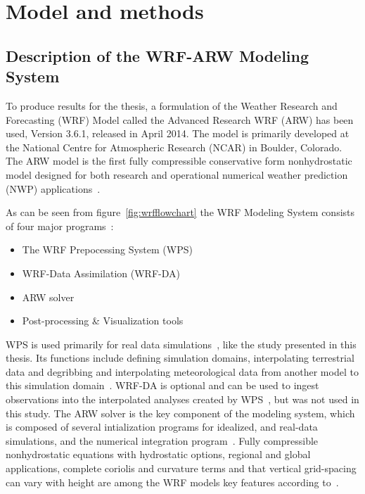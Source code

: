 \chapter{Model and methods}
\label{chap:modmet}
\section{Description of the WRF-ARW Modeling System}
\label{sec:modeldes}

To produce results for the thesis, a formulation of the Weather Research and Forecasting (WRF) Model called the Advanced Research WRF (ARW) has been used, Version 3.6.1, released in April 2014. The model is primarily developed at the National Centre for Atmospheric Research (NCAR) in Boulder, Colorado. The ARW model is the first fully compressible conservative form nonhydrostatic model designed for both research and operational numerical weather prediction (NWP) applications~\citep{Skamarock2008}. 

As can be seen from figure~\ref{fig:wrfflowchart} the WRF Modeling System consists of four major programs~\citep{Wang2015}:
\begin{itemize}
\item The WRF Prepocessing System (WPS)
\item WRF-Data Assimilation (WRF-DA)
\item ARW solver
\item Post-processing \& Visualization tools
\end{itemize}

WPS is used primarily for real data simulations~\citep{Wang2015}, like the study presented in this thesis. Its functions include defining simulation domains, interpolating terrestrial data and degribbing and interpolating meteorological data from another model to this simulation domain~\citep{Wang2015}. WRF-DA is optional and can be used to ingest observations into the interpolated analyses created by WPS~\citep{Wang2015}, but was not used in this study. The ARW solver is the key component of the modeling system, which is composed of several intialization programs for idealized, and real-data simulations, and the numerical integration program~\citep{Wang2015}. Fully compressible nonhydrostatic equations with hydrostatic options, regional and global applications, complete coriolis and curvature terms and that vertical grid-spacing can vary with height are among the WRF models key features according to~\citet{Wang2015}.

